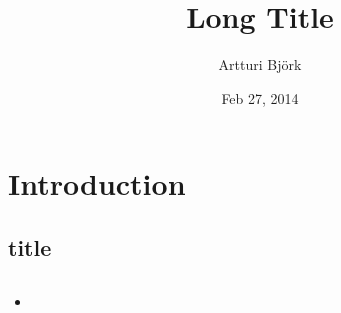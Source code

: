 \documentclass{beamer}					%
\title[Short Title]{Long Title}
\author[Björk]{Artturi Björk}
\institute[Aalto]{Aalto University}
\date{Feb 27, 2014}
\begin{document}
\section{Introduction}
	\subsection{title}
		\begin{frame}[plain]
			\titlepage
		\end{frame}

	\subsection{}
		\begin{frame}{}
			\begin{itemize}
            	\item
			\end{itemize}
		\end{frame}
    

		
\printbibliography
\clearpage
\end{document}
